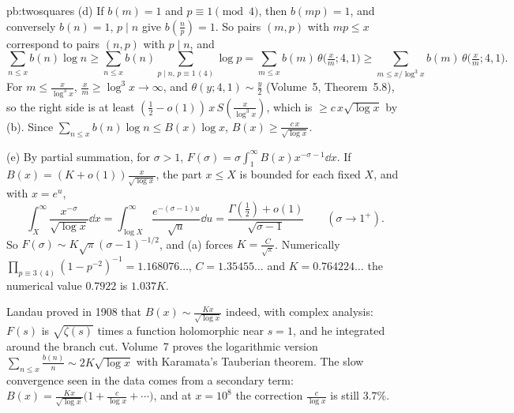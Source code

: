 \begin{solution}{pb:twosquares}
(d) If $b(m)=1$ and $p\equiv1\pmod4$, then $b(mp)=1$, and conversely $b(n)=1$, $p\mid n$ give $b(\frac np)=1$. So pairs $(m,p)$ with $mp\le x$ correspond to pairs $(n,p)$ with $p\mid n$, and
\[
\sum_{n\le x}b(n)\log n\ge\sum_{n\le x}b(n)\sum_{p\mid n,\,p\equiv1\,(4)}\log p=\sum_{m\le x}b(m)\,\theta\bigl(\tfrac xm;4,1\bigr)\ge\sum_{m\le x/\log^3x}b(m)\,\theta\bigl(\tfrac xm;4,1\bigr).
\]
For $m\le\frac x{\log^3x}$, $\frac xm\ge\log^3x\to\infty$, and $\theta(y;4,1)\sim\frac y2$ (Volume~5, Theorem~5.8), so the right side is at least $(\frac12-o(1))\,x\,S(\frac x{\log^3x})$, which
is $\ge c\,x\sqrt{\log x}$ by (b). Since $\sum_{n\le x}b(n)\log n\le B(x)\log x$, $B(x)\ge\frac{c\,x}{\sqrt{\log x}}$.

(e) By partial summation, for $\sigma>1$, $F(\sigma)=\sigma\int_1^\infty B(x)x^{-\sigma-1}\dd x$. If $B(x)=(K+o(1))\frac x{\sqrt{\log x}}$, the part $x\le X$ is bounded for each fixed $X$, and
with $x=e^u$,
\[
\int_X^\infty\frac{x^{-\sigma}}{\sqrt{\log x}}\dd x=\int_{\log X}^\infty\frac{e^{-(\sigma-1)u}}{\sqrt u}\dd u=\frac{\Gamma(\frac12)+o(1)}{\sqrt{\sigma-1}}\qquad(\sigma\to1^+).
\]
So $F(\sigma)\sim K\sqrt\pi(\sigma-1)^{-1/2}$, and (a) forces $K=\frac C{\sqrt\pi}$. Numerically $\prod_{p\equiv3\,(4)}(1-p^{-2})^{-1}=1.168076\ldots$, $C=1.35455\ldots$ and $K=0.764224\ldots$
the numerical value $0.7922$ is $1.037K$.


\leads Landau proved in 1908 that $B(x)\sim\frac{Kx}{\sqrt{\log x}}$ indeed, with complex analysis: $F(s)$ is $\sqrt{\zeta(s)}$ times a function holomorphic near $s=1$, and he integrated
around the branch cut. Volume~7 proves the logarithmic version $\sum_{n\le x}\frac{b(n)}n\sim2K\sqrt{\log x}$ with Karamata's Tauberian theorem. The slow convergence seen in the
data comes from a secondary term: $B(x)=\frac{Kx}{\sqrt{\log x}}\bigl(1+\frac{c}{\log x}+\cdots\bigr)$, and at $x=10^8$ the correction $\frac c{\log x}$ is still $3.7\%$.
\end{solution}


